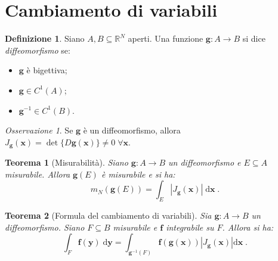 \documentclass[a4paper,12pt]{report}
\theoremstyle{plain}
\newtheorem{thm}{Teorema}[section]
\theoremstyle{definition}
\newtheorem{defn}{Definizione}[section]
\theoremstyle{remark}
\newtheorem{oss}{Osservazione}[section]
\newcommand{\diff}[1]{\mathrm{d}#1}
\numberwithin{equation}{section}
\begin{document}
\section{Cambiamento di variabili}
\begin{defn} Siano $A,B\subseteq \mathbb{R}^N$ aperti. Una funzione $\mathbf{g}:A\to B$ si dice \textit{diffeomorfismo} se:
\begin{itemize}
 \item $\mathbf{g}$ è bigettiva;
 \item $\mathbf{g}\in C^1(A)$;
 \item $\mathbf{g}^{-1}\in C^1(B)$.
\end{itemize}
\end{defn}
\begin{oss} Se $\mathbf{g}$ è un diffeomorfismo, allora $J_{\mathbf{g}}(\mathbf{x})=\det\{D\mathbf{g}(\mathbf{x})\}\ne 0\;\forall \mathbf{x}$.
\end{oss}
\begin{thm}[Misurabilità] Siano $\mathbf{g}:A\to B$ un diffeomorfismo e $E\subseteq A$ misurabile. Allora $\mathbf{g}(E)$ è misurabile e si ha:
\begin{equation}
m_N(\mathbf{g}(E))=\int_E |J_{\mathbf{g}}(\mathbf{x})|\;\diff{\mathbf{x}}\;.
\end{equation}
\end{thm}
\begin{thm}[Formula del cambiamento di variabili] Sia $\mathbf{g}:A\to B$ un diffeomorfismo. Siano $F\subseteq B$ misurabile e $\mathbf{f}$ integrabile su $F$. Allora si ha:
\begin{equation}
\int_F \mathbf{f}(\mathbf{y})\;\diff{\mathbf{y}}=\int_{\mathbf{g}^{-1}(F)}\mathbf{f}(\mathbf{g}(\mathbf{x}))|J_{\mathbf{g}}(\mathbf{x})|\diff{\mathbf{x}}\;.
\end{equation}
\end{thm}
\end{document}
